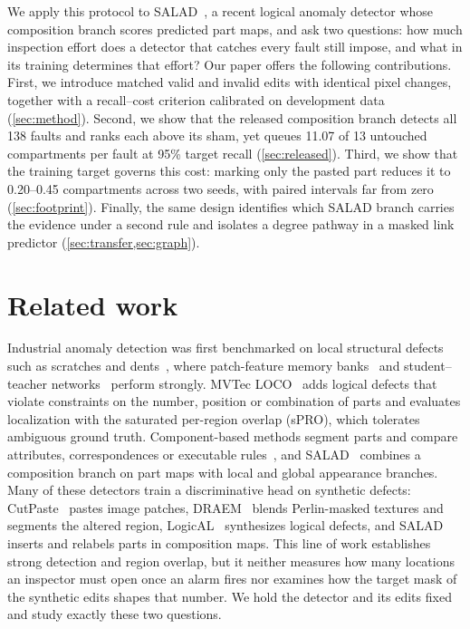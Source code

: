 \documentclass[10pt,twocolumn,letterpaper]{article}
\begin{document}
We apply this protocol to SALAD~\cite{fucka2025}, a recent logical anomaly detector whose composition branch scores predicted part maps, and ask two questions: how much inspection effort does a detector that catches every fault still impose, and what in its training determines that effort? Our paper offers the following contributions. First, we introduce matched valid and invalid edits with identical pixel changes, together with a recall--cost criterion calibrated on development data (\cref{sec:method}). Second, we show that the released composition branch detects all 138 faults and ranks each above its sham, yet queues 11.07 of 13 untouched compartments per fault at 95\% target recall (\cref{sec:released}). Third, we show that the training target governs this cost: marking only the pasted part reduces it to 0.20--0.45 compartments across two seeds, with paired intervals far from zero (\cref{sec:footprint}). Finally, the same design identifies which SALAD branch carries the evidence under a second rule and isolates a degree pathway in a masked link predictor (\cref{sec:transfer,sec:graph}).

\section{Related work}
\label{sec:related}
Industrial anomaly detection was first benchmarked on local structural defects such as scratches and dents~\cite{bergmann2019mvtec}, where patch-feature memory banks~\cite{roth2022patchcore} and student--teacher networks~\cite{batzner2024} perform strongly. MVTec LOCO~\cite{bergmann2022} adds logical defects that violate constraints on the number, position or combination of parts and evaluates localization with the saturated per-region overlap (sPRO), which tolerates ambiguous ground truth. Component-based methods segment parts and compare attributes, correspondences or executable rules~\cite{liu2023,peng2025,zhang2026logico,ji2026}, and SALAD~\cite{fucka2025} combines a composition branch on part maps with local and global appearance branches. Many of these detectors train a discriminative head on synthetic defects: CutPaste~\cite{li2021cutpaste} pastes image patches, DRAEM~\cite{zavrtanik2021draem} blends Perlin-masked textures and segments the altered region, LogicAL~\cite{zhao2024} synthesizes logical defects, and SALAD inserts and relabels parts in composition maps. This line of work establishes strong detection and region overlap, but it neither measures how many locations an inspector must open once an alarm fires nor examines how the target mask of the synthetic edits shapes that number. We hold the detector and its edits fixed and study exactly these two questions.
\end{document}
